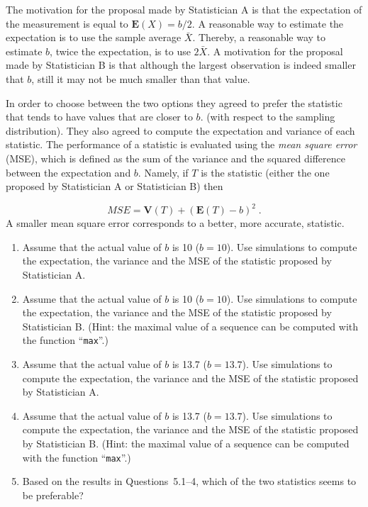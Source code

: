 \documentclass[]{krantz}
\newcommand{\Expec}{\mathbf{E}}
\newcommand{\Var}{\mathbf{V}}
\theoremstyle{definition}
\theoremstyle{definition}
\theoremstyle{definition}
\theoremstyle{remark}
\begin{document}
The motivation for the proposal made by Statistician A is that the
expectation of the measurement is equal to \(\Expec(X) = b/2\). A
reasonable way to estimate the expectation is to use the sample average
\(\bar X\). Thereby, a reasonable way to estimate \(b\), twice the
expectation, is to use \(2 \bar X\). A motivation for the proposal made by
Statistician B is that although the largest observation is indeed
smaller that \(b\), still it may not be much smaller than that value.

In order to choose between the two options they agreed to prefer the
statistic that tends to have values that are closer to \(b\). (with
respect to the sampling distribution). They also agreed to compute the
expectation and variance of each statistic. The performance of a
statistic is evaluated using the \emph{mean square error} (MSE), which is
defined as the sum of the variance and the squared difference between
the expectation and \(b\). Namely, if \(T\) is the statistic (either the one
proposed by Statistician A or Statistician B) then

\[MSE = \Var(T) + (\Expec(T) - b)^2\;.\] A smaller mean square error
corresponds to a better, more accurate, statistic.

\begin{enumerate}
\def\labelenumi{\arabic{enumi}.}
\item
  Assume that the actual value of \(b\) is 10 (\(b=10\)). Use simulations
  to compute the expectation, the variance and the MSE of the
  statistic proposed by Statistician A.
\item
  Assume that the actual value of \(b\) is 10 (\(b=10\)). Use simulations
  to compute the expectation, the variance and the MSE of the
  statistic proposed by Statistician B. (Hint: the maximal value of a
  sequence can be computed with the function ``\texttt{max}''.)
\item
  Assume that the actual value of \(b\) is 13.7 (\(b=13.7\)). Use
  simulations to compute the expectation, the variance and the MSE of
  the statistic proposed by Statistician A.
\item
  Assume that the actual value of \(b\) is 13.7 (\(b=13.7\)). Use
  simulations to compute the expectation, the variance and the MSE of
  the statistic proposed by Statistician B. (Hint: the maximal value
  of a sequence can be computed with the function ``\texttt{max}''.)
\item
  Based on the results in Questions~5.1--4, which of the two statistics
  seems to be preferable?
\end{enumerate}
\end{document}
